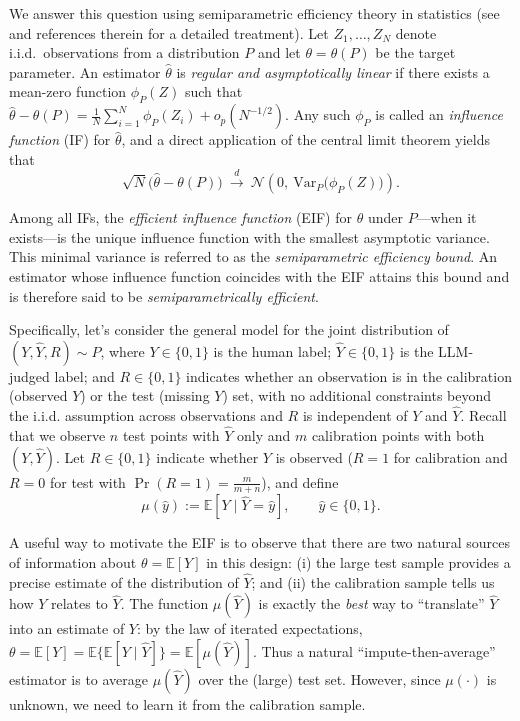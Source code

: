 \documentclass[11pt]{article}
\newcommand{\E}{\mathbb{E}}
\newcommand{\Var}{\mathrm{Var}}
\newcommand{\1}{\mathbf{1}}
\theoremstyle{remark}
\begin{document}
We answer this question using semiparametric efficiency theory in statistics (see~\citet{bickel1993efficient,van2000asymptotic} and references therein for a detailed treatment). Let
$Z_1,\dots,Z_N$ denote i.i.d.\ observations from a distribution $P$ and let $\theta=\theta(P)$ be the
target parameter. An estimator $\hat\theta$ is \emph{regular and asymptotically linear} if there exists
a mean-zero function $\phi_P(Z)$ such that $
\hat\theta-\theta(P)
=
\frac{1}{N}\sum_{i=1}^N \phi_P(Z_i) + o_p(N^{-1/2})$.
Any such $\phi_P$ is called an \emph{influence function} (IF) for $\hat\theta$, and a direct application of the central limit theorem yields that
\[
\sqrt{N}\bigl(\hat\theta-\theta(P)\bigr)\ \xrightarrow{d}\ 
\mathcal N\!\left(0,\ \Var_P\!\bigl(\phi_P(Z)\bigr)\right).
\]

Among all IFs, the \emph{efficient influence function} (EIF) for $\theta$ under $P$---when it exists---is the unique influence function with the smallest asymptotic variance. This minimal variance is referred to as the \emph{semiparametric efficiency bound}. An estimator whose influence function coincides with the EIF attains this bound and is therefore said to be \emph{semiparametrically efficient}.

Specifically, let's consider the general model for the joint distribution of $(Y,\hat Y, R)\sim P$, where
$Y\in\{0,1\}$ is the human label; $\hat Y\in\{0,1\}$ is the LLM-judged label; and $R \in \{0,1\}$ indicates whether an observation is in the calibration (observed $Y$) or the test (missing $Y$) set, with no additional constraints beyond the i.i.d. assumption across observations and $R$ is independent of $Y$ and $\hat{Y}$. Recall that we observe $n$ test points
with $\hat Y$ only and $m$ calibration points with both $(Y,\hat Y)$. Let $R\in\{0,1\}$ indicate whether
$Y$ is observed ($R=1$ for calibration and $R=0$ for test with $\Pr(R=1)=\frac{m}{m+n}$), and define
\[
\mu(\hat y):=\E[Y\mid \hat Y=\hat y],\qquad \hat y\in\{0,1\}.
\]

A useful way to motivate the EIF is to observe that there are two natural sources of information about $\theta=\E[Y]$ in this design:
(i) the large test sample provides a precise estimate of the distribution of $\hat Y$; and
(ii) the calibration sample tells us how $Y$ relates to $\hat Y$.
The function $\mu(\hat Y)$ is exactly the \emph{best} way to ``translate'' $\hat Y$ into an estimate of $Y$:
by the law of iterated expectations, $\theta=\E[Y]=\E\{\E[Y\mid \hat Y]\}=\E[\mu(\hat Y)]$.
Thus a natural ``impute-then-average'' estimator is to average $\mu(\hat Y)$ over the (large) test set.
However, since $\mu(\cdot)$ is unknown, we need to learn it from the calibration sample.
\end{document}
